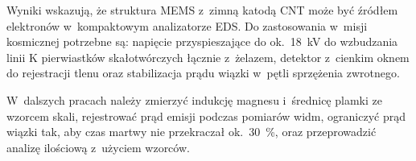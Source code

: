 Wyniki wskazują, że struktura MEMS z~zimną katodą CNT może być źródłem
elektronów w~kompaktowym analizatorze EDS. Do zastosowania w~misji
kosmicznej potrzebne są: 
napięcie przyspieszające do ok.~\SI{18}{\kilo\volt} do wzbudzania
linii K pierwiastków skałotwórczych łącznie z~żelazem, detektor
z~cienkim oknem do rejestracji tlenu oraz stabilizacja prądu wiązki
w~pętli sprzężenia zwrotnego.

W~dalszych pracach należy  zmierzyć indukcję
magnesu i~średnicę plamki ze wzorcem skali, rejestrować prąd emisji
podczas pomiarów widm, ograniczyć prąd wiązki tak, aby czas martwy nie
przekraczał ok.~\SI{30}{\percent}, oraz przeprowadzić analizę ilościową
z~użyciem wzorców.
